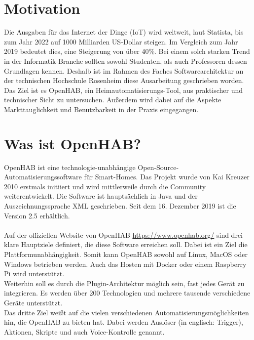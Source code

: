 \section{Motivation}
{Die Ausgaben für das Internet der Dinge (IoT) wird weltweit, laut Statista, bis zum Jahr 2022 auf 1000 Milliarden US-Dollar steigen. Im Vergleich zum Jahr 2019 bedeutet dies, eine Steigerung von über 40\%.}\cite{STATISTA01:IOT} Bei einem solch starken Trend in der Informatik-Branche sollten sowohl Studenten, als auch Professoren dessen Grundlagen kennen.
Deshalb ist im Rahmen des Faches Softwarearchitektur an der technischen Hochschule Rosenheim diese Ausarbeitung geschrieben worden. Das Ziel ist es OpenHAB, ein Heimautomatisierungs-Tool, aus praktischer und technischer Sicht zu untersuchen. Außerdem wird dabei auf die Aspekte Markttauglichkeit und Benutzbarkeit in der Praxis eingegangen.

\section{Was ist OpenHAB?}
\label{s:what-is-openhab}
OpenHAB ist eine technologie-unabhängige Open-Source-Automatisierungssoftware für Smart-Homes.
Das Projekt wurde von Kai Kreuzer 2010 erstmals initiiert und wird mittlerweile durch die Community weiterentwickelt. Die Software ist hauptsächlich in Java und der Auszeichnungssprache XML geschrieben. Seit dem 16. Dezember 2019 ist die Version 2.5 erhältlich.\\
\\
Auf der offiziellen Website von OpenHAB \url{https://www.openhab.org/} sind drei klare Hauptziele definiert, die diese Software erreichen soll. Dabei ist ein Ziel die Plattformunabhängigkeit. Somit kann OpenHAB sowohl auf Linux, MacOS oder Windows betrieben werden. Auch das Hosten mit Docker oder einem Raspberry Pi wird unterstützt.\\
Weiterhin soll es durch die Plugin-Architektur möglich sein, fast jedes Gerät zu integrieren.
Es werden über 200 Technologien und mehrere tausende verschiedene Geräte unterstützt.\\
Das dritte Ziel weißt auf die vielen verschiedenen Automatisierungsmöglichkeiten hin, die OpenHAB zu bieten hat. Dabei werden Auslöser (in englisch: Trigger), Aktionen, Skripte und auch Voice-Kontrolle genannt.

